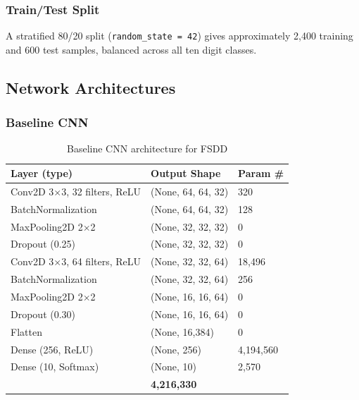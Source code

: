 \documentclass[12pt,a4paper]{article}
\begin{document}
\subsubsection{Train/Test Split}

A stratified 80/20 split (\texttt{random\_state = 42}) gives approximately
2,400 training and 600 test samples, balanced across all ten digit classes.

\subsection{Network Architectures}

\subsubsection{Baseline CNN}

\begin{table}[H]
\centering
\caption{Baseline CNN architecture for FSDD}
\label{tab:b_baseline_arch}
\begin{tabular}{L{5cm} C{3.5cm} C{2.5cm}}
\toprule
{}
\textbf{Layer (type)} & \textbf{Output Shape} & \textbf{Param \#} \\
\midrule
Conv2D 3$\times$3, 32 filters, ReLU & (None, 64, 64, 32) & 320 \\
BatchNormalization                   & (None, 64, 64, 32) & 128 \\
MaxPooling2D 2$\times$2              & (None, 32, 32, 32) & 0 \\
Dropout (0.25)                       & (None, 32, 32, 32) & 0 \\
Conv2D 3$\times$3, 64 filters, ReLU & (None, 32, 32, 64) & 18,496 \\
BatchNormalization                   & (None, 32, 32, 64) & 256 \\
MaxPooling2D 2$\times$2              & (None, 16, 16, 64) & 0 \\
Dropout (0.30)                       & (None, 16, 16, 64) & 0 \\
Flatten                              & (None, 16,384)      & 0 \\
Dense (256, ReLU)                    & (None, 256)         & 4,194,560 \\
Dense (10, Softmax)                  & (None, 10)          & 2,570 \\
\midrule
{}
 & \textbf{4,216,330} \\
\bottomrule
\end{tabular}
\end{table}
\end{document}
